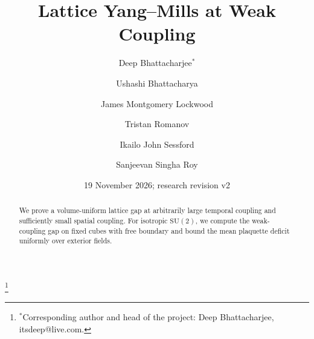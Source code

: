 \documentclass[11pt]{amsart}
\theoremstyle{definition}
\theoremstyle{remark}
\numberwithin{equation}{section}
\begin{document}

\title{Lattice Yang--Mills at Weak Coupling}

\author[D. Bhattacharjee]{Deep Bhattacharjee$^{*}$}
\address{Formerly, Electro-Gravitational Space Propulsion Laboratory
(EGSPL), Bhubaneswar, Odisha 751030, India; formerly, University of Calcutta (Heramba Chandra College), 23/49 Gariahat
Road, Golpark, Kolkata 700029, West Bengal, India}
\thanks{$^{*}$Corresponding author and head of the project: Deep Bhattacharjee, itsdeep@live.com.}

\author[U. Bhattacharya]{Ushashi Bhattacharya}
\address{Formerly, National Taiwan University, Taipei 106319, Taiwan}

\author[J. M. Lockwood]{James Montgomery Lockwood}
\address{Independent Researcher, San Antonio, USA}

\author[T. Romanov]{Tristan Romanov}
\address{Independent Researcher, San Francisco, CA, USA}

\author[I. J. Sessford]{Ikailo John Sessford}
\address{Ikailo Inc., Whitby, Ontario, Canada}

\author[S. Singha Roy]{Sanjeevan Singha Roy}
\address{Department of Physics, Birla Institute of Technology, Mesra, Ranchi,
Jharkhand 835215, India}

\date{19 November 2026; research revision v2}


\begin{abstract}
We prove a volume-uniform lattice gap at arbitrarily large temporal coupling and sufficiently small spatial coupling. For isotropic $\mathrm{SU}(2)$, we compute the weak-coupling gap on fixed cubes with free boundary and bound the mean plaquette deficit uniformly over exterior fields.
\end{abstract}
\end{document}
